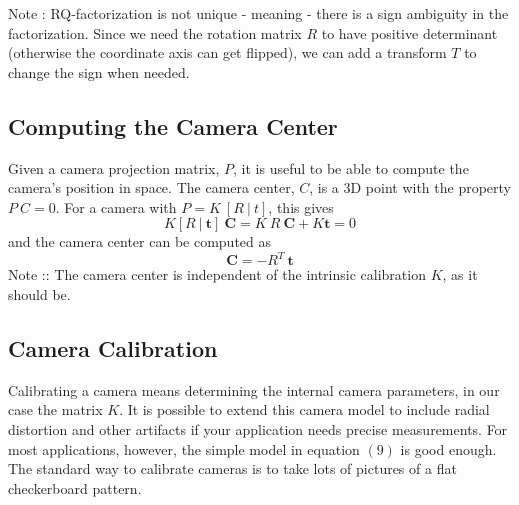 \documentclass[a4paper,12pt]{extarticle}
\theoremstyle{mytheor}
\begin{document}
Note : RQ-factorization is not unique - meaning - there is a sign ambiguity in the factorization. Since we need the rotation matrix $R$ to have positive determinant (otherwise the coordinate axis can get flipped), we can add a transform $T$ to change the sign when needed.

\subsection{Computing the Camera Center}
Given a camera projection matrix, $P$, it is  useful to be able to compute the camera's position in space. The camera center, $C$, is a 3D point with the property $P \: C = 0 $. For a camera with $P = K \: [R \: | \: t]$, this gives
\begin{equation}
K [ R \: | \: \textbf{t} ] \: \textbf{C} = K \: R \: \textbf{C} + K \textbf{t} = 0
\end{equation}
and the camera center can be computed as
\begin{equation}
\textbf{C} = - R^{T} \: \textbf{t}
\end{equation}
Note :: The camera center is independent of the intrinsic calibration $K$, as it should be.


\subsection{Camera Calibration}
Calibrating a camera means determining the internal camera parameters, in our case the matrix $K$. It is possible to extend this camera model to include radial distortion and other artifacts if your application needs precise measurements. For most applications, however, the simple model in equation $(9)$ is good enough. The standard way to calibrate cameras is to take lots of pictures of a flat checkerboard pattern. 
\end{document}
